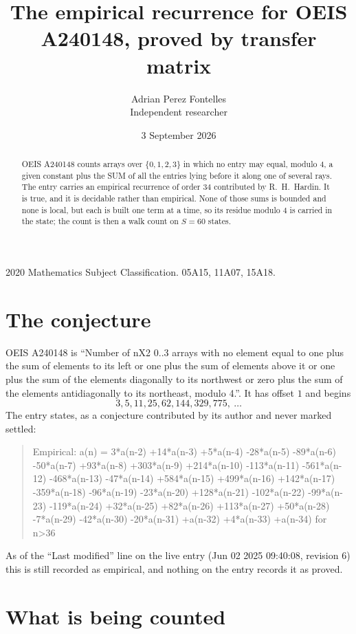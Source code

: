 \documentclass[11pt,a4paper]{article}
\title{The empirical recurrence for OEIS A240148, proved by transfer matrix}
\author{Adrian Perez Fontelles\\ \small Independent researcher}
\date{3 September 2026}
\theoremstyle{plain}
\theoremstyle{definition}
\begin{document}
\maketitle

\begin{abstract}
OEIS A240148 counts arrays over $\{0,1,2,3\}$ in which no entry may equal, modulo $4$, a given
constant plus the SUM of all the entries lying before it along one of several rays. The entry
carries an empirical recurrence of order $34$ contributed by R.~H.~Hardin. It is true, and
it is decidable rather than empirical. None of those sums is bounded and none is local, but
each is built one term at a time, so its residue modulo $4$ is carried in the state; the
count is then a walk count on $S=60$ states.
\end{abstract}

\noindent\small 2020 Mathematics Subject Classification. 05A15, 11A07, 15A18.\normalsize

\section{The conjecture}

OEIS A240148 is ``Number of nX2 0..3 arrays with no element equal to one plus the sum of elements to its left or one plus the sum of elements above it or one plus the sum of the elements diagonally to its northwest or zero plus the sum of the elements antidiagonally to its northeast, modulo 4.''. It has offset $1$ and begins
\[
3, 5, 11, 25, 62, 144, 329, 775,\ \dots
\]
The entry states, as a conjecture contributed by its author and never marked settled:
\begin{quote}
Empirical: a(n) = 3*a(n-2) +14*a(n-3) +5*a(n-4) -28*a(n-5) -89*a(n-6) -50*a(n-7) +93*a(n-8) +303*a(n-9) +214*a(n-10) -113*a(n-11) -561*a(n-12) -468*a(n-13) -47*a(n-14) +584*a(n-15) +499*a(n-16) +142*a(n-17) -359*a(n-18) -96*a(n-19) -23*a(n-20) +128*a(n-21) -102*a(n-22) -99*a(n-23) -119*a(n-24) +32*a(n-25) +82*a(n-26) +113*a(n-27) +50*a(n-28) -7*a(n-29) -42*a(n-30) -20*a(n-31) +a(n-32) +4*a(n-33) +a(n-34) for n>36
\end{quote}
As of the ``Last modified'' line on the live entry (Jun 02 2025 09:40:08, revision 6) this is still
recorded as empirical, and nothing on the entry records it as proved.

\section{What is being counted}
\end{document}

